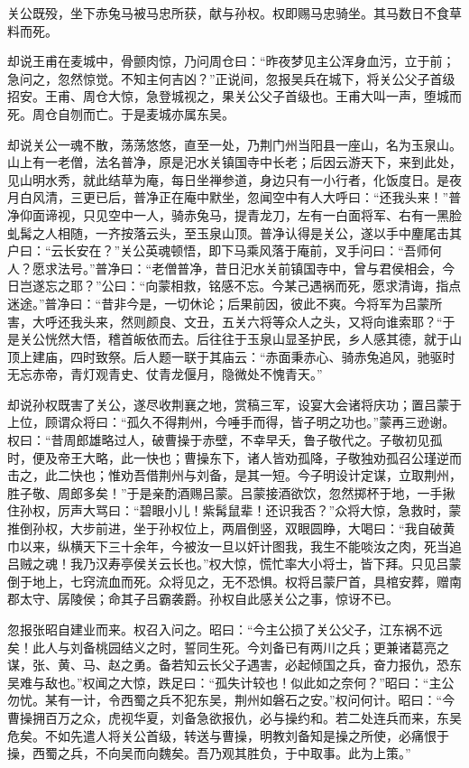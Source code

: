 关公既殁，坐下赤兔马被马忠所获，献与孙权。权即赐马忠骑坐。其马数日不食草料而死。

却说王甫在麦城中，骨颤肉惊，乃问周仓曰：“昨夜梦见主公浑身血污，立于前；急问之，忽然惊觉。不知主何吉凶？”正说间，忽报吴兵在城下，将关公父子首级招安。王甫、周仓大惊，急登城视之，果关公父子首级也。王甫大叫一声，堕城而死。周仓自刎而亡。于是麦城亦属东吴。

却说关公一魂不散，荡荡悠悠，直至一处，乃荆门州当阳县一座山，名为玉泉山。山上有一老僧，法名普净，原是汜水关镇国寺中长老；后因云游天下，来到此处，见山明水秀，就此结草为庵，每日坐禅参道，身边只有一小行者，化饭度日。是夜月白风清，三更已后，普净正在庵中默坐，忽闻空中有人大呼曰：“还我头来！”普净仰面谛视，只见空中一人，骑赤兔马，提青龙刀，左有一白面将军、右有一黑脸虬髯之人相随，一齐按落云头，至玉泉山顶。普净认得是关公，遂以手中麈尾击其户曰：“云长安在？”关公英魂顿悟，即下马乘风落于庵前，叉手问曰：“吾师何人？愿求法号。”普净曰：“老僧普净，昔日汜水关前镇国寺中，曾与君侯相会，今日岂遂忘之耶？”公曰：“向蒙相救，铭感不忘。今某己遇祸而死，愿求清诲，指点迷途。”普净曰：“昔非今是，一切休论；后果前因，彼此不爽。今将军为吕蒙所害，大呼还我头来，然则颜良、文丑，五关六将等众人之头，又将向谁索耶？“于是关公恍然大悟，稽首皈依而去。后往往于玉泉山显圣护民，乡人感其德，就于山顶上建庙，四时致祭。后人题一联于其庙云：“赤面秉赤心、骑赤兔追风，驰驱时无忘赤帝，青灯观青史、仗青龙偃月，隐微处不愧青天。”

却说孙权既害了关公，遂尽收荆襄之地，赏稿三军，设宴大会诸将庆功；置吕蒙于上位，顾谓众将曰：“孤久不得荆州，今唾手而得，皆子明之功也。”蒙再三逊谢。权曰：“昔周郎雄略过人，破曹操于赤壁，不幸早夭，鲁子敬代之。子敬初见孤时，便及帝王大略，此一快也；曹操东下，诸人皆劝孤降，子敬独劝孤召公瑾逆而击之，此二快也；惟劝吾借荆州与刘备，是其一短。今子明设计定谋，立取荆州，胜子敬、周郎多矣！”于是亲酌酒赐吕蒙。吕蒙接酒欲饮，忽然掷杯于地，一手揪住孙权，厉声大骂曰：“碧眼小儿！紫髯鼠辈！还识我否？”众将大惊，急救时，蒙推倒孙权，大步前进，坐于孙权位上，两眉倒竖，双眼圆睁，大喝曰：“我自破黄巾以来，纵横天下三十余年，今被汝一旦以奸计图我，我生不能啖汝之肉，死当追吕贼之魂！我乃汉寿亭侯关云长也。”权大惊，慌忙率大小将士，皆下拜。只见吕蒙倒于地上，七窍流血而死。众将见之，无不恐惧。权将吕蒙尸首，具棺安葬，赠南郡太守、孱陵侯；命其子吕霸袭爵。孙权自此感关公之事，惊讶不已。

忽报张昭自建业而来。权召入问之。昭曰：“今主公损了关公父子，江东祸不远矣！此人与刘备桃园结义之时，誓同生死。今刘备已有两川之兵；更兼诸葛亮之谋，张、黄、马、赵之勇。备若知云长父子遇害，必起倾国之兵，奋力报仇，恐东吴难与敌也。”权闻之大惊，跌足曰：“孤失计较也！似此如之奈何？”昭曰：“主公勿忧。某有一计，令西蜀之兵不犯东吴，荆州如磐石之安。”权问何计。昭曰：“今曹操拥百万之众，虎视华夏，刘备急欲报仇，必与操约和。若二处连兵而来，东吴危矣。不如先遣人将关公首级，转送与曹操，明教刘备知是操之所使，必痛恨于操，西蜀之兵，不向吴而向魏矣。吾乃观其胜负，于中取事。此为上策。”

